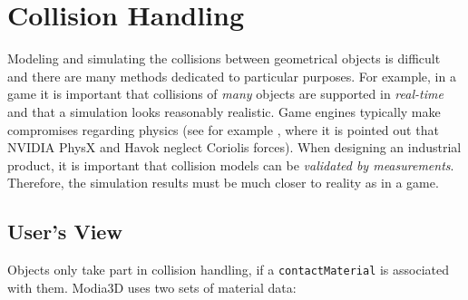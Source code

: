 
\section{Collision Handling}\label{sec:collHandling}

Modeling and simulating the collisions between geometrical objects is difficult and there are many
methods dedicated to particular purposes. For example, in a game it is important that  
collisions of \emph{many} objects are supported in \emph{real-time} and that a simulation looks 
reasonably realistic. Game engines typically make compromises regarding physics (see for
example \cite{Erez2015}, where it is pointed out that NVIDIA PhysX and Havok neglect
Coriolis forces).
When designing an industrial product, it is important that collision models can be \emph{validated by measurements}. Therefore, the simulation results must
be much closer to reality as in a game.




\subsection{User's View}

Objects only take part in collision handling, if a \texttt{contactMaterial} is
associated with them. Modia3D uses two sets of material data:

